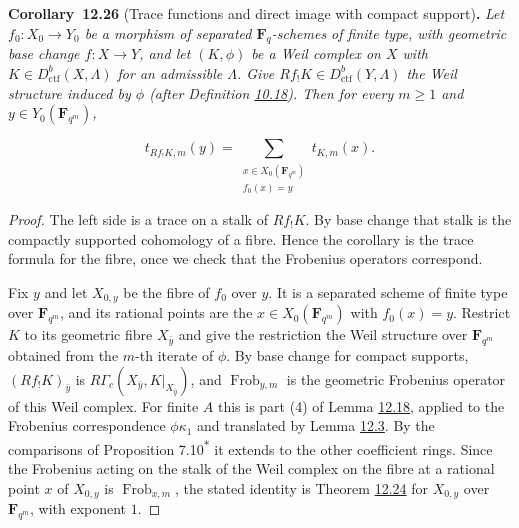 \documentclass[11pt]{article}
\newenvironment{bpstatement}[2]{\par\addvspace{0.6\baselineskip}\noindent\textbf{#1}#2\textbf{.}\enspace\ignorespaces}
  {\par\addvspace{0.4\baselineskip}}
\newenvironment{bpstatementit}[2]{\begin{bpstatement}{#1}{#2}\itshape\ignorespaces}{\end{bpstatement}}
\newcommand{\bpout}[1]{#1\textsuperscript{\hyperlink{bp-outside}{\ensuremath{\ast}}}}
\begin{document}
\label{bp305}%
\begin{bpstatementit}{Corollary~12.26}{ (Trace functions and direct image with compact support)}
Let \(f_0:X_0\to Y_0\) be a morphism of separated \(\mathbf F_q\)-schemes of finite type, with geometric base change \(f:X\to Y\), and let \((K,\phi)\) be a Weil complex on \(X\) with \(K\in D^b_{\mathrm{ctf}}(X,\Lambda)\) for an admissible \(\Lambda\). Give \(Rf_!K\in D^b_{\mathrm{ctf}}(Y,\Lambda)\) the Weil structure induced by \(\phi\) (after Definition \hyperref[bp156]{10.18}). Then for every \(m\geq1\) and \(y\in Y_0(\mathbf F_{q^m})\),

\[
t_{Rf_!K,m}(y)=\sum_{\substack{x\in X_0(\mathbf F_{q^m})\\ f_0(x)=y}}
t_{K,m}(x).
\]
\end{bpstatementit}

\begin{proof}[{Proof}]\label{bp306}%
The left side is a trace on a stalk of \(Rf_!K\). By base change that stalk is the compactly supported cohomology of a fibre. Hence the corollary is the trace formula for the fibre, once we check that the Frobenius operators correspond.

Fix \(y\) and let \(X_{0,y}\) be the fibre of \(f_0\) over \(y\). It is a separated scheme of finite type over \(\mathbf F_{q^m}\), and its rational points are the \(x\in X_0(\mathbf F_{q^m})\) with \(f_0(x)=y\). Restrict \(K\) to its geometric fibre \(X_{\bar y}\) and give the restriction the Weil structure over \(\mathbf F_{q^m}\) obtained from the \(m\)-th iterate of \(\phi\). By base change for compact supports, \((Rf_!K)_{\bar y}\) is \(R\Gamma_c(X_{\bar y},K|_{X_{\bar y}})\), and \(\operatorname{Frob}_{y,m}\) is the geometric Frobenius operator of this Weil complex. For finite \(A\) this is part (4) of Lemma \hyperref[bp280]{12.18}, applied to the Frobenius correspondence \(\phi\kappa_1\) and translated by Lemma \hyperref[bp234]{12.3}. By the comparisons of Proposition \bpout{7.10} it extends to the other coefficient rings. Since the Frobenius acting on the stalk of the Weil complex on the fibre at a rational point \(x\) of \(X_{0,y}\) is \(\operatorname{Frob}_{x,m}\), the stated identity is Theorem \hyperref[bp298]{12.24} for \(X_{0,y}\) over \(\mathbf F_{q^m}\), with exponent \(1\).
\end{proof}
\end{document}
